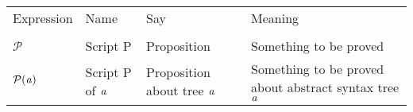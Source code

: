 \documentclass[12pt]{article}
\begin{document}
\begin{tabular}[b] {p{} p{} p{} p{}}
Expression & Name & Say & Meaning \\ \\
$\mathcal{P}$ & Script P & Proposition & Something to be proved \\
$\mathcal{P}(\it{a})$ & Script P of $\it{a}$ & Proposition about tree $\it{a}$ & Something to be proved about abstract syntax tree $\it{a}$


\end{tabular}
\end{document}
